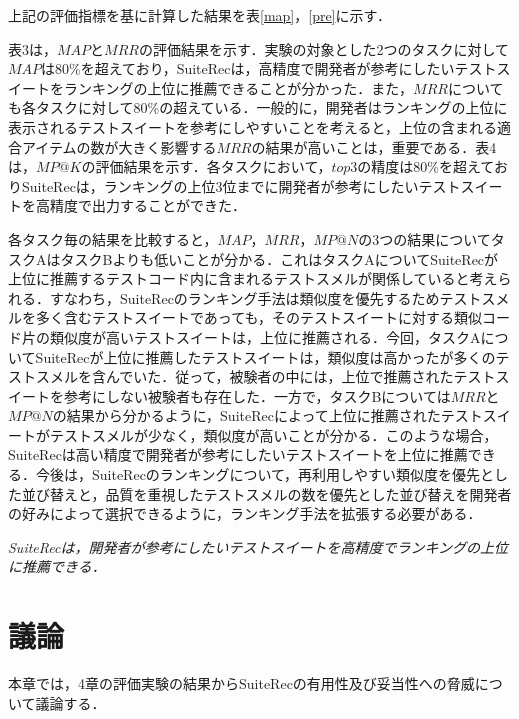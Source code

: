 \documentclass[12pt]{jarticle} %
\begin{document}
上記の評価指標を基に計算した結果を表\ref{map}，\ref{pre}に示す．

表3は，$MAP$と$MRR$の評価結果を示す．実験の対象とした2つのタスクに対して$MAP$は80\%を超えており，{\sf SuiteRec}は，高精度で開発者が参考にしたいテストスイートをランキングの上位に推薦できることが分かった．また，$MRR$についても各タスクに対して80\%の超えている．一般的に，開発者はランキングの上位に表示されるテストスイートを参考にしやすいことを考えると，上位の含まれる適合アイテムの数が大きく影響する$MRR$の結果が高いことは，重要である．表4は，$MP@K$の評価結果を示す．各タスクにおいて，$top3$の精度は$80$\%を超えており{\sf SuiteRec}は，ランキングの上位$3$位までに開発者が参考にしたいテストスイートを高精度で出力することができた．

各タスク毎の結果を比較すると，$MAP$，$MRR$，$MP@N$の3つの結果についてタスクAはタスクBよりも低いことが分かる．これはタスクAについて{\sf SuiteRec}が上位に推薦するテストコード内に含まれるテストスメルが関係していると考えられる．すなわち，{\sf SuiteRec}のランキング手法は類似度を優先するためテストスメルを多く含むテストスイートであっても，そのテストスイートに対する類似コード片の類似度が高いテストスイートは，上位に推薦される．今回，タスクAについて{\sf SuiteRec}が上位に推薦したテストスイートは，類似度は高かったが多くのテストスメルを含んでいた．従って，被験者の中には，上位で推薦されたテストスイートを参考にしない被験者も存在した．一方で，タスクBについては$MRR$と$MP@N$の結果から分かるように，{\sf SuiteRec}によって上位に推薦されたテストスイートがテストスメルが少なく，類似度が高いことが分かる．このような場合，{\sf SuiteRec}は高い精度で開発者が参考にしたいテストスイートを上位に推薦できる．今後は，{\sf SuiteRec}のランキングについて，再利用しやすい類似度を優先とした並び替えと，品質を重視したテストスメルの数を優先とした並び替えを開発者の好みによって選択できるように，ランキング手法を拡張する必要がある．

\vspace{\baselineskip}

\begin{breakbox}
\textit{{\sf SuiteRec}は，開発者が参考にしたいテストスイートを高精度でランキングの上位に推薦できる．}
\end{breakbox}


\newpage
\section{議論}

本章では，4章の評価実験の結果から{\sf SuiteRec}の有用性及び妥当性への脅威について議論する．
\end{document}
